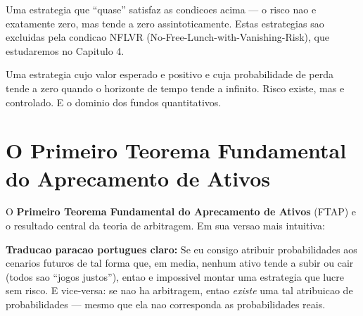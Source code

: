 \begin{defi}
Uma estrategia que ``quase'' satisfaz as condicoes acima --- o risco nao
e exatamente zero, mas tende a zero assintoticamente. Estas estrategias
sao excluidas pela condicao NFLVR (No-Free-Lunch-with-Vanishing-Risk),
que estudaremos no Capitulo 4.
\end{defi}

\begin{defi}
Uma estrategia cujo valor esperado e positivo e cuja probabilidade de
perda tende a zero quando o horizonte de tempo tende a infinito. Risco
existe, mas e controlado. E o dominio dos fundos quantitativos.
\end{defi}

\section{O Primeiro Teorema Fundamental do Aprecamento de Ativos}

O \textbf{Primeiro Teorema Fundamental do Aprecamento de Ativos} (FTAP) e o
resultado central da teoria de arbitragem. Em sua versao mais intuitiva:

\begin{center}
\end{center}

\textbf{Traducao paracao portugues claro:} Se eu consigo atribuir
probabilidades aos cenarios futuros de tal forma que, em media, nenhum
ativo tende a subir ou cair (todos sao ``jogos justos''), entao e
impossivel montar uma estrategia que lucre sem risco. E vice-versa: se
nao ha arbitragem, entao \textit{existe} uma tal atribuicao de
probabilidades --- mesmo que ela nao corresponda as probabilidades reais.

\begin{center}
\end{center}

